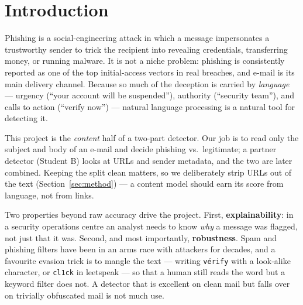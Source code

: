 \documentclass[11pt]{article}
\begin{document}
\section{Introduction}

Phishing is a social-engineering attack in which a message impersonates a
trustworthy sender to trick the recipient into revealing credentials, transferring
money, or running malware. It is not a niche problem: phishing is consistently
reported as one of the top initial-access vectors in real breaches, and e-mail is
its main delivery channel. Because so much of the deception is carried by
\emph{language} --- urgency (``your account will be suspended''), authority
(``security team''), and calls to action (``verify now'') --- natural language
processing is a natural tool for detecting it.

This project is the \emph{content} half of a two-part detector. Our job is to read
only the subject and body of an e-mail and decide phishing vs.\ legitimate; a
partner detector (Student B) looks at URLs and sender metadata, and the two are
later combined. Keeping the split clean matters, so we deliberately strip URLs out
of the text (Section~\ref{sec:method}) --- a content model should earn its score
from language, not from links.

Two properties beyond raw accuracy drive the project. First, \textbf{explainability}:
in a security operations centre an analyst needs to know \emph{why} a message was
flagged, not just that it was. Second, and most importantly, \textbf{robustness}.
Spam and phishing filters have been in an arms race with attackers for decades, and
a favourite evasion trick is to mangle the text --- writing \texttt{v\'{e}rify} with a
look-alike character, or \texttt{cl1ck} in leetspeak --- so that a human still reads
the word but a keyword filter does not. A detector that is excellent on clean mail
but falls over on trivially obfuscated mail is not much use.
\end{document}
